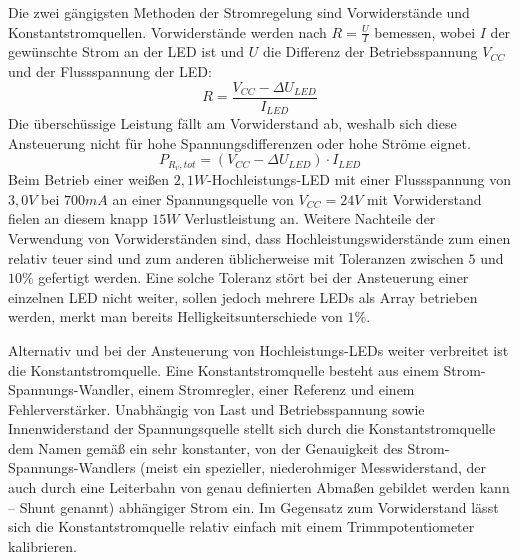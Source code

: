 \documentclass[12pt,a4paper,notitlepage]{article}
\begin{document}
Die zwei gängigsten Methoden der Stromregelung sind Vorwiderstände und Konstantstromquellen. Vorwiderstände werden nach $R=\frac{U}{I}$ bemessen, wobei $I$ der gewünschte Strom an der \gls{LED} ist und $U$ die Differenz der Betriebsspannung $V_{CC}$ und der \gls{Flussspannung} der \gls{LED}:
\begin{equation}
R=\frac{V_{CC}-\Delta U_{LED}}{I_{LED}}
\end{equation}
Die überschüssige Leistung fällt am Vorwiderstand ab, weshalb sich diese Ansteuerung nicht für hohe Spannungsdifferenzen oder hohe Ströme eignet.
\begin{equation}
P_{R_v,tot}=\left(V_{CC}-\Delta U_{LED}\right)\cdot I_{LED}
\end{equation}
Beim Betrieb einer weißen $2,1W$-Hochleistungs-\gls{LED} mit einer Flussspannung von $3,0V$ bei $700mA$ an einer Spannungsquelle von $V_{CC}=24V$ mit Vorwiderstand fielen an diesem knapp $15W$ Verlustleistung an.
Weitere Nachteile der Verwendung von Vorwiderständen sind, dass Hochleistungswiderstände zum einen relativ teuer sind und zum anderen üblicherweise mit Toleranzen zwischen $5$ und $10\%$ gefertigt werden. Eine solche Toleranz stört bei der Ansteuerung einer einzelnen \gls{LED} nicht weiter, sollen jedoch mehrere \glspl{LED} als Array betrieben werden, merkt man bereits Helligkeitsunterschiede von $1\%$.

Alternativ und bei der Ansteuerung von Hochleistungs-\glspl{LED} weiter verbreitet ist die Konstantstromquelle. Eine Konstantstromquelle besteht aus einem Strom-Spannungs-Wandler, einem Stromregler, einer Referenz und einem Fehlerverstärker. Unabhängig von Last und Betriebsspannung sowie Innenwiderstand der Spannungsquelle stellt sich durch die Konstantstromquelle dem Namen gemäß ein sehr konstanter, von der Genauigkeit des Strom-Spannungs-Wandlers (meist ein spezieller, niederohmiger Messwiderstand, der auch durch eine Leiterbahn von genau definierten Abmaßen gebildet werden kann -- \gls{Shunt} genannt) abhängiger Strom ein. Im Gegensatz zum Vorwiderstand lässt sich die Konstantstromquelle relativ einfach mit einem Trimmpotentiometer kalibrieren.
\end{document}
